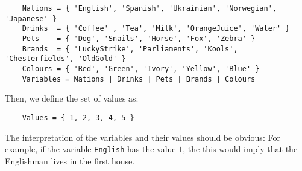 \begin{verbatim}
    Nations = { 'English', 'Spanish', 'Ukrainian', 'Norwegian', 'Japanese' }
    Drinks  = { 'Coffee' , 'Tea', 'Milk', 'OrangeJuice', 'Water' }
    Pets    = { 'Dog', 'Snails', 'Horse', 'Fox', 'Zebra' }
    Brands  = { 'LuckyStrike', 'Parliaments', 'Kools', 'Chesterfields', 'OldGold' }
    Colours = { 'Red', 'Green', 'Ivory', 'Yellow', 'Blue' }
    Variables = Nations | Drinks | Pets | Brands | Colours
\end{verbatim}

\noindent
Then, we define the set of values as:
\begin{verbatim}
    Values = { 1, 2, 3, 4, 5 }
\end{verbatim}
The interpretation of the variables and their values should be obvious: For example, if the variable
\texttt{English} has the value $1$, the this would imply that the Englishman lives in the first house. 


